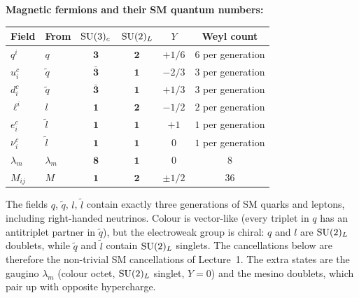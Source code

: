 \documentclass[11pt,a4paper]{article}
\begin{document}
\medskip

\textbf{Magnetic fermions and their SM quantum numbers:}

\renewcommand{\arraystretch}{1.4}
\begin{center}
\begin{tabular}{l l c c c c}
\toprule
\textbf{Field} & \textbf{From} & $\mathrm{SU}(3)_c$ & $\mathrm{SU}(2)_L$ & $Y$
  & \textbf{Weyl count} \\
\midrule
$q^i$ & $q$ & $\mathbf{3}$ & $\mathbf{2}$ & $+1/6$ & $6$ per generation \\
$u^c_i$ & $\widetilde{q}$ & $\bar{\mathbf{3}}$ & $\mathbf{1}$ & $-2/3$ & $3$ per generation \\
$d^c_i$ & $\widetilde{q}$ & $\bar{\mathbf{3}}$ & $\mathbf{1}$ & $+1/3$ & $3$ per generation \\
\midrule
$\ell^i$ & $l$ & $\mathbf{1}$ & $\mathbf{2}$ & $-1/2$ & $2$ per generation \\
$e^c_i$ & $\widetilde{l}$ & $\mathbf{1}$ & $\mathbf{1}$ & $+1$ & $1$ per generation \\
$\nu^c_i$ & $\widetilde{l}$ & $\mathbf{1}$ & $\mathbf{1}$ & $0$ & $1$ per generation \\
\midrule
$\lambda_m$ & $\lambda_m$ & $\mathbf{8}$ & $\mathbf{1}$ & $0$ & $8$ \\
$M_{ij}$ & $M$ & $\mathbf{1}$ & $\mathbf{2}$ & $\pm 1/2$ & $36$ \\
\bottomrule
\end{tabular}
\label{tab:magnetic-SM-quantum}
\end{center}

\medskip

The fields $q$, $\widetilde{q}$, $l$, $\widetilde{l}$ contain exactly
three generations of SM quarks and leptons, including right-handed
neutrinos.  Colour is vector-like (every triplet in $q$ has an
antitriplet partner in $\widetilde{q}$), but the electroweak group is
chiral: $q$ and $l$ are $\mathrm{SU}(2)_L$ doublets, while $\widetilde{q}$ and
$\widetilde{l}$ contain $\mathrm{SU}(2)_L$ singlets.  The cancellations below
are therefore the non-trivial SM cancellations of Lecture~1.  The extra
states are the gaugino $\lambda_m$ (colour octet, $\mathrm{SU}(2)_L$ singlet,
$Y = 0$) and the mesino doublets, which pair up with opposite
hypercharge.
\end{document}
